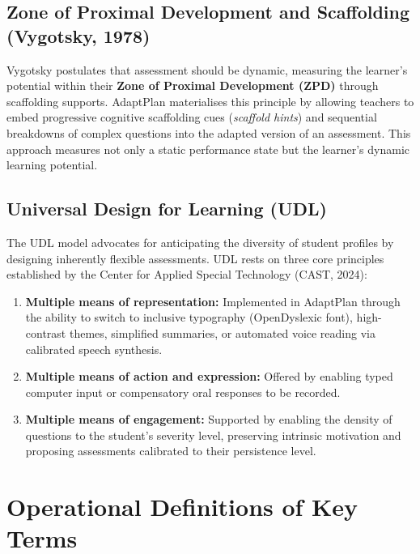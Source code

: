 \documentclass[12pt,a4paper]{report}
\begin{document}
\subsection{Zone of Proximal Development and Scaffolding (Vygotsky, 1978)}

Vygotsky postulates that assessment should be dynamic, measuring the learner's potential within their \textbf{Zone of Proximal Development (ZPD)} through scaffolding supports. AdaptPlan materialises this principle by allowing teachers to embed progressive cognitive scaffolding cues (\textit{scaffold hints}) and sequential breakdowns of complex questions into the adapted version of an assessment. This approach measures not only a static performance state but the learner's dynamic learning potential.

\subsection{Universal Design for Learning (UDL)}

The UDL model advocates for anticipating the diversity of student profiles by designing inherently flexible assessments. UDL rests on three core principles established by the Center for Applied Special Technology (CAST, 2024):

\begin{enumerate}[leftmargin=*, label=\arabic*.]
  \item \textbf{Multiple means of representation:} Implemented in AdaptPlan through the ability to switch to inclusive typography (OpenDyslexic font), high-contrast themes, simplified summaries, or automated voice reading via calibrated speech synthesis.
  \item \textbf{Multiple means of action and expression:} Offered by enabling typed computer input or compensatory oral responses to be recorded.
  \item \textbf{Multiple means of engagement:} Supported by enabling the density of questions to the student's severity level, preserving intrinsic motivation and proposing assessments calibrated to their persistence level.
\end{enumerate}

\section{Operational Definitions of Key Terms}
\end{document}
